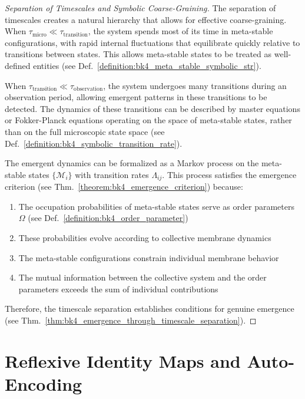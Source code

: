 \begin{proof}[Separation of Timescales and Symbolic Coarse-Graining]
\label{proof:bk4_timescale_separation_hierarchy}
The separation of timescales creates a natural hierarchy that allows for effective coarse-graining. When $\tau_{\text{micro}} \ll \tau_{\text{transition}}$, the system spends most of its time in meta-stable configurations, with rapid internal fluctuations that equilibrate quickly relative to transitions between states. This allows meta-stable states to be treated as well-defined entities (see Def.~\ref{definition:bk4_meta_stable_symbolic_str}).

When $\tau_{\text{transition}} \ll \tau_{\text{observation}}$, the system undergoes many transitions during an observation period, allowing emergent patterns in these transitions to be detected. The dynamics of these transitions can be described by master equations or Fokker-Planck equations operating on the space of meta-stable states, rather than on the full microscopic state space (see Def.~\ref{definition:bk4_symbolic_transition_rate}).

The emergent dynamics can be formalized as a Markov process on the meta-stable states $\{\mathcal{M}_i\}$ with transition rates $\Lambda_{ij}$. This process satisfies the emergence criterion (see Thm.~\ref{theorem:bk4_emergence_criterion}) because:
\begin{enumerate}
    \item The occupation probabilities of meta-stable states serve as order parameters $\Omega$ (see Def.~\ref{definition:bk4_order_parameter})
    \item These probabilities evolve according to collective membrane dynamics
    \item The meta-stable configurations constrain individual membrane behavior
    \item The mutual information between the collective system and the order parameters exceeds the sum of individual contributions
\end{enumerate}
Therefore, the timescale separation establishes conditions for genuine emergence (see Thm.~\ref{thm:bk4_emergence_through_timescale_separation}).
\end{proof}
\section{Reflexive Identity Maps and Auto-Encoding} \label{sec:bk4_reflexive_identity_maps_auto_encoding}

